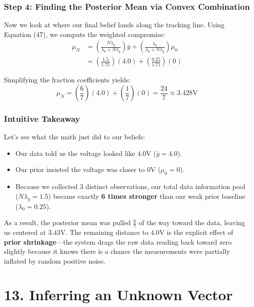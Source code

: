 \documentclass{article}
\begin{document}
\subsubsection*{Step 4: Finding the Posterior Mean via Convex Combination}
Now we look at where our final belief lands along the tracking line. Using Equation (47), we compute the weighted compromise:
\begin{align}
\mu_N &= \left( \frac{N\lambda_y}{\lambda_0 + N\lambda_y} \right)\bar{y} + \left( \frac{\lambda_0}{\lambda_0 + N\lambda_y} \right)\mu_0 \nonumber \\[0.5em]
&= \left( \frac{1.5}{1.75} \right)(4.0) + \left( \frac{0.25}{1.75} \right)(0) \tag{56}
\end{align}

Simplifying the fraction coefficients yields:
\begin{equation}
\mu_N = \left(\frac{6}{7}\right)(4.0) + \left(\frac{1}{7}\right)(0) = \frac{24}{7} \approx 3.428\text{V} \tag{57}
\end{equation}

\subsubsection*{Intuitive Takeaway}
Let's see what the math just did to our beliefs:
\begin{itemize}
    \item Our data told us the voltage looked like $4.0\text{V}$ ($\bar{y} = 4.0$).
    \item Our prior insisted the voltage was closer to $0\text{V}$ ($\mu_0 = 0$).
    \item Because we collected $3$ distinct observations, our total data information pool ($N\lambda_y = 1.5$) became exactly \textbf{6 times stronger} than our weak prior baseline ($\lambda_0 = 0.25$).
\end{itemize}
As a result, the posterior mean was pulled $\frac{6}{7}$ of the way toward the data, leaving us centered at $3.43\text{V}$. The remaining distance to $4.0\text{V}$ is the explicit effect of \textbf{prior shrinkage}—the system drags the raw data reading back toward zero slightly because it knows there is a chance the measurements were partially inflated by random positive noise.

\section*{13. Inferring an Unknown Vector}
\end{document}
